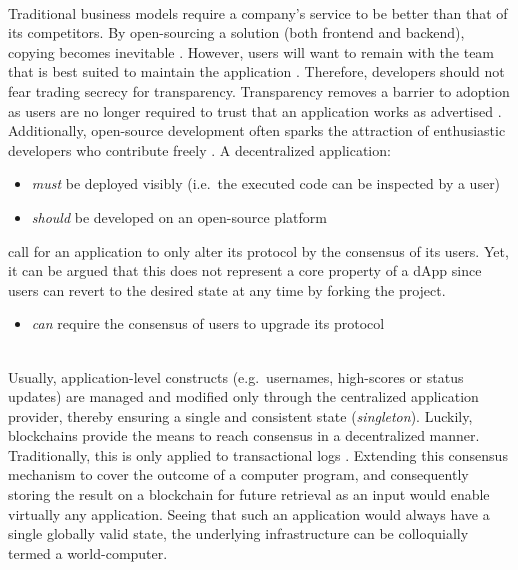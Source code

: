 \begin{description}[format={\storedescriptionlabel}]
	\item[Open-source]
	\hfill \\	
	Traditional business models require a company's service to be better than that of its competitors. By open-sourcing a solution (both frontend and backend), copying becomes inevitable \cite[p.~10]{Raval.2016}. However, users will want to remain with the team that is best suited to maintain the application \cite[p.~11]{Raval.2016}. Therefore, developers should not fear trading secrecy for transparency. Transparency removes a barrier to adoption as users are no longer required to trust that an application works as advertised \cite[p.~9]{Raval.2016}. Additionally, open-source development often sparks the attraction of enthusiastic developers who contribute freely \cite[p.~11]{Raval.2016}. A decentralized application:
	
	\begin{itemize}
  		\item \textit{must} be deployed visibly (i.e.~the executed code can be inspected by a user)
  		\item \textit{should} be developed on an open-source platform
	\end{itemize}
	
	\citeauthor{Johnston2015} call for an application to only alter its protocol by the consensus of its users. Yet, it can be argued that this does not represent a core property of a \ac{dApp} since users can revert to the desired state at any time by forking the project.

	\begin{itemize}
  		\item \textit{can} require the consensus of users to upgrade its protocol
	\end{itemize}

	\item[Decentralized \label{decentralizedConsensus} consensus]
	\hfill \\
	Usually, application-level constructs (e.g.~usernames, high-scores or status updates) are managed and modified only through the centralized application provider, thereby ensuring a single and consistent state (\textit{singleton}). Luckily, blockchains provide the means to reach consensus in a decentralized manner. Traditionally, this is only applied to transactional logs \cite[p.~1]{bitcoin}. Extending this consensus mechanism to cover the outcome of a computer program, and consequently storing the result on a blockchain for future retrieval as an input would enable virtually any application. Seeing that such an application would always have a single globally valid state, the underlying infrastructure can be colloquially termed a world-computer.
	

\end{description}
